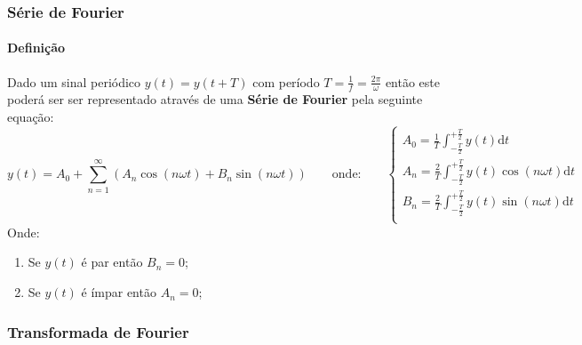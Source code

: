 \documentclass{article}
\begin{document}
            \subsubsection{Série de Fourier}
                \paragraph{Definição}Dado um sinal periódico $y(t) = y(t + T)$ com período $T = \frac{1}{f} = \frac{2\pi}{\omega}$ então este poderá ser ser representado através de uma \textbf{Série de Fourier} pela seguinte equação:
                    \begin{equation}
                        \boxed{
                            y(t) = 
                            A_{0} + 
                            \sum_{n=1}^{\infty} (A_{n}\cos(n\omega t) + B_{n}\sin(n\omega t))
                        }
                        \qquad
                        \text{onde:}
                        \qquad
                        \boxed{
                            \begin{cases}
                                A_{0} = \frac{1}{T} \int_{-\frac{T}{2}}^{+\frac{T}{2}} y(t)\text{d}t\\[2.5mm]
                                A_{n} = \frac{2}{T} \int_{-\frac{T}{2}}^{+\frac{T}{2}} y(t)\cos(n\omega t)\text{d}t\\[2.5mm]
                                B_{n} = \frac{2}{T} \int_{-\frac{T}{2}}^{+\frac{T}{2}} y(t)\sin(n\omega t)\text{d}t\\
                            \end{cases}
                        }
                    \end{equation}
                Onde:
                    \begin{enumerate}[noitemsep]
                        \item Se $y(t)$ é par então $B_{n} = 0$;
                        \item Se $y(t)$ é ímpar então $A_{n} = 0$;
                    \end{enumerate}

            \subsubsection{Transformada de Fourier}
\end{document}
